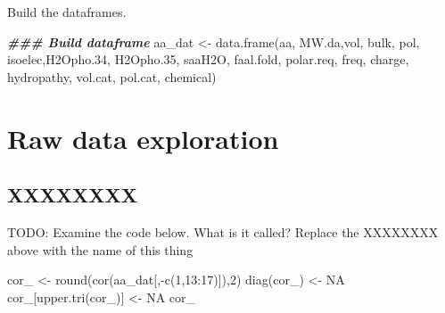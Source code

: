 \documentclass[
]{book}
\newenvironment{Shaded}{\begin{snugshade}}{\end{snugshade}}
\newcommand{\ConstantTok}[1]{\textcolor[rgb]{0.00,0.00,0.00}{#1}}
\newcommand{\DecValTok}[1]{\textcolor[rgb]{0.00,0.00,0.81}{#1}}
\newcommand{\DocumentationTok}[1]{\textcolor[rgb]{0.56,0.35,0.01}{\textbf{\textit{#1}}}}
\newcommand{\FloatTok}[1]{\textcolor[rgb]{0.00,0.00,0.81}{#1}}
\newcommand{\FunctionTok}[1]{\textcolor[rgb]{0.00,0.00,0.00}{#1}}
\newcommand{\NormalTok}[1]{#1}
\newcommand{\OtherTok}[1]{\textcolor[rgb]{0.56,0.35,0.01}{#1}}
\newcommand{\SpecialCharTok}[1]{\textcolor[rgb]{0.00,0.00,0.00}{#1}}
\begin{document}
Build the dataframes.

\begin{Shaded}
\begin{Highlighting}[]
\DocumentationTok{\#\#\# Build dataframe}
\NormalTok{aa\_dat }\OtherTok{\textless{}{-}} \FunctionTok{data.frame}\NormalTok{(aa, }
\NormalTok{                     MW.da,vol,}
\NormalTok{                     bulk, pol, }
\NormalTok{                     isoelec,H2Opho}\FloatTok{.34}\NormalTok{, H2Opho}\FloatTok{.35}\NormalTok{,}
\NormalTok{                     saaH2O, faal.fold, polar.req,}
\NormalTok{                     freq, charge, hydropathy,}
\NormalTok{                     vol.cat, pol.cat, chemical)}
\end{Highlighting}
\end{Shaded}

\hypertarget{raw-data-exploration-1}{%
\section{Raw data exploration}\label{raw-data-exploration-1}}

\hypertarget{xxxxxxxx-1}{%
\subsection{XXXXXXXX}\label{xxxxxxxx-1}}

TODO: Examine the code below. What is it called? Replace the XXXXXXXX above with the name of this thing

\begin{Shaded}
\begin{Highlighting}[]
\NormalTok{cor\_ }\OtherTok{\textless{}{-}} \FunctionTok{round}\NormalTok{(}\FunctionTok{cor}\NormalTok{(aa\_dat[,}\SpecialCharTok{{-}}\FunctionTok{c}\NormalTok{(}\DecValTok{1}\NormalTok{,}\DecValTok{13}\SpecialCharTok{:}\DecValTok{17}\NormalTok{)]),}\DecValTok{2}\NormalTok{)}
\FunctionTok{diag}\NormalTok{(cor\_) }\OtherTok{\textless{}{-}} \ConstantTok{NA}
\NormalTok{cor\_[}\FunctionTok{upper.tri}\NormalTok{(cor\_)] }\OtherTok{\textless{}{-}} \ConstantTok{NA}
\NormalTok{cor\_}
\end{Highlighting}
\end{Shaded}
\end{document}

